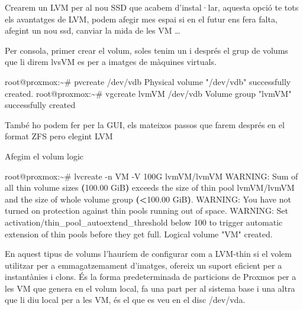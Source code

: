 \documentclass[
  10pt,
]{krantz}
\newenvironment{Shaded}{\begin{snugshade}}{\end{snugshade}}
\newcommand{\AttributeTok}[1]{\textcolor[rgb]{0.77,0.63,0.00}{#1}}
\newcommand{\BuiltInTok}[1]{#1}
\newcommand{\ErrorTok}[1]{\textcolor[rgb]{0.64,0.00,0.00}{\textbf{#1}}}
\newcommand{\ExtensionTok}[1]{#1}
\newcommand{\KeywordTok}[1]{\textcolor[rgb]{0.13,0.29,0.53}{\textbf{#1}}}
\newcommand{\NormalTok}[1]{#1}
\newcommand{\OperatorTok}[1]{\textcolor[rgb]{0.81,0.36,0.00}{\textbf{#1}}}
\newcommand{\StringTok}[1]{\textcolor[rgb]{0.31,0.60,0.02}{#1}}
\begin{document}
Crearem un LVM per al nou SSD que acabem d'instal·lar, aquesta opció te tots els avantatges de LVM, podem afegir mes espai si en el futur ens fera falta, afegint un nou ssd, canviar la mida de les VM \ldots{}

Per consola, primer crear el volum, soles tenim un i després el grup de volums que li direm lvsVM es per a imatges de màquines virtuals.

\begin{Shaded}
\begin{Highlighting}[]
\ExtensionTok{root@proxmox:\textasciitilde{}\#}\NormalTok{ pvcreate /dev/vdb}
  \ExtensionTok{Physical}\NormalTok{ volume }\StringTok{"/dev/vdb"}\NormalTok{ successfully created.}
\ExtensionTok{root@proxmox:\textasciitilde{}\#}\NormalTok{ vgcreate lvmVM /dev/vdb}
  \ExtensionTok{Volume}\NormalTok{ group }\StringTok{"lvmVM"}\NormalTok{ successfully created}
\end{Highlighting}
\end{Shaded}

També ho podem fer per la GUI, els mateixos passos que farem després en el format ZFS pero elegint LVM

Afegim el volum logic

\begin{Shaded}
\begin{Highlighting}[]
\ExtensionTok{root@proxmox:\textasciitilde{}\#}\NormalTok{ lvcreate }\AttributeTok{{-}n}\NormalTok{ VM }\AttributeTok{{-}V}\NormalTok{ 100G lvmVM/lvmVM}
  \ExtensionTok{WARNING:}\NormalTok{ Sum of all thin volume sizes }\ErrorTok{(}\ExtensionTok{100.00}\NormalTok{ GiB}\KeywordTok{)} \ExtensionTok{exceeds}\NormalTok{ the size of thin pool}
  \ExtensionTok{lvmVM/lvmVM}\NormalTok{ and the size of whole volume group }\ErrorTok{(}\OperatorTok{\textless{}}\NormalTok{100.00 }\ExtensionTok{GiB}\KeywordTok{)}\BuiltInTok{.}
  \ExtensionTok{WARNING:}\NormalTok{ You have not turned on protection against thin pools running out of space.}
  \ExtensionTok{WARNING:}\NormalTok{ Set activation/thin\_pool\_autoextend\_threshold below 100 to trigger}
  \ExtensionTok{automatic}\NormalTok{ extension of thin pools before they get full.}
  \ExtensionTok{Logical}\NormalTok{ volume }\StringTok{"VM"}\NormalTok{ created.}
\end{Highlighting}
\end{Shaded}

En aquest tipus de volums l'hauríem de configurar com a LVM-thin si el volem utilitzar per a emmagatzemament d'imatges, ofereix un suport eficient per a instantànies i clons. És la forma predeterminada de particions de Proxmos per a les VM que genera en el volum local, fa una part per al sistema base i una altra que li diu local per a les VM, és el que es veu en el disc /dev/vda.
\end{document}
